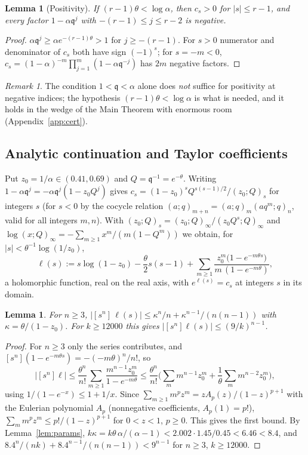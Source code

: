 \documentclass[11pt,a4paper]{article}
\numberwithin{equation}{section}
\newtheorem{lemma}[theorem]{Lemma}
\theoremstyle{definition}
\theoremstyle{remark}
\newtheorem{remark}[theorem]{Remark}
\newcommand{\qq}{\mathfrak q}
\begin{document}
\begin{lemma}[Positivity]\label{lem:positivity}
If $(r-1)\theta<\log\alpha$, then $c_s>0$ for $|s|\le r-1$, and every factor $1-\alpha\qq^{j}$ with
$-(r-1)\le j\le r-2$ is negative.
\end{lemma}

\begin{proof}
$\alpha\qq^{j}\ge\alpha e^{-(r-1)\theta}>1$ for $j\ge-(r-1)$. For $s>0$ numerator and denominator of $c_s$ both have sign
$(-1)^s$; for $s=-m<0$, $c_s=(1-\alpha)^{-m}\prod_{j=1}^m(1-\alpha\qq^{-j})$ has $2m$ negative factors.
\end{proof}

\begin{remark}
The condition $1<\qq<\alpha$ alone does \emph{not} suffice for positivity at negative indices; the hypothesis
$(r-1)\theta<\log\alpha$ is what is needed, and it holds in the wedge of the Main Theorem with enormous room
(Appendix~\ref{app:cert}).
\end{remark}

\subsection{Analytic continuation and Taylor coefficients}
Put $z_0=1/\alpha\in(0.41,0.69)$ and $Q=\qq^{-1}=e^{-\theta}$. Writing $1-\alpha\qq^j=-\alpha\qq^j(1-z_0Q^j)$ gives
$c_s=(1-z_0)^sQ^{s(s-1)/2}/(z_0;Q)_s$ for integers $s$ (for $s<0$ by the cocycle relation
$(a;q)_{m+n}=(a;q)_m(aq^m;q)_n$, valid for all integers $m,n$). With $(z_0;Q)_s=(z_0;Q)_\infty/(z_0Q^s;Q)_\infty$
and $\log(x;Q)_\infty=-\sum_{m\ge1}x^m/(m(1-Q^m))$ we obtain, for $|s|<\theta^{-1}\log(1/z_0)$,
\begin{equation}\label{eq:logc}
\ell(s):=s\log(1-z_0)-\frac\theta2 s(s-1)+\sum_{m\ge1}\frac{z_0^m\big(1-e^{-m\theta s}\big)}{m\,(1-e^{-m\theta})},
\end{equation}
a holomorphic function, real on the real axis, with $e^{\ell(s)}=c_s$ at integers $s$ in its domain.

\begin{lemma}\label{lem:refcoef}
For $n\ge3$, $|[s^n]\,\ell(s)|\le\kappa^n/n+\kappa^{n-1}/(n(n-1))$ with $\kappa=\theta/(1-z_0)$. For $k\ge12000$
this gives $|[s^n]\ell(s)|\le(9/k)^{n-1}$.
\end{lemma}

\begin{proof}
For $n\ge3$ only the series contributes, and $[s^n](1-e^{-m\theta s})=-(-m\theta)^n/n!$, so
\[
|[s^n]\ell|\le\frac{\theta^n}{n!}\sum_{m\ge1}\frac{m^{n-1}z_0^m}{1-e^{-m\theta}}
\le\frac{\theta^n}{n!}\Big(\sum_m m^{n-1}z_0^m+\frac1\theta\sum_m m^{n-2}z_0^m\Big),
\]
using $1/(1-e^{-x})\le1+1/x$. Since $\sum_{m\ge1}m^pz^m=zA_p(z)/(1-z)^{p+1}$ with the Eulerian polynomial
$A_p$ (nonnegative coefficients, $A_p(1)=p!$), $\sum_m m^pz^m\le p!/(1-z)^{p+1}$ for $0<z<1$, $p\ge0$. This gives the
first bound. By Lemma~\ref{lem:params}, $k\kappa=k\theta\,\alpha/(\alpha-1)<2.002\cdot1.45/0.45<6.46<8.4$, and
$8.4^n/(nk)+8.4^{n-1}/(n(n-1))<9^{n-1}$ for $n\ge3$, $k\ge12000$.
\end{proof}
\end{document}
